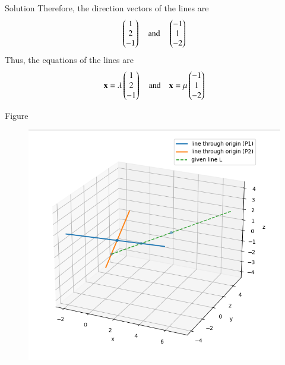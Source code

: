 \documentclass{beamer}
\begin{document}
\begin{frame}{Solution}
Therefore, the direction vectors of the lines are
\begin{align}
    \begin{pmatrix}1\\2\\-1\end{pmatrix} \quad \text{and} \quad \begin{pmatrix}-1\\1\\-2\end{pmatrix}
\end{align}
Thus, the equations of the lines are
\begin{align}
    \mathbf{x} = \lambda\begin{pmatrix}1\\2\\-1\end{pmatrix} \quad \text{and} \quad 
    \mathbf{x} = \mu\begin{pmatrix}-1\\1\\-2\end{pmatrix}
\end{align}
\end{frame}
\begin{frame}{Figure}
\begin{figure}[h!]
    \centering
    \includegraphics[height=0.5\textheight, keepaspectratio]{figs/fig.png}
\end{figure}
\end{frame}
\end{document}
